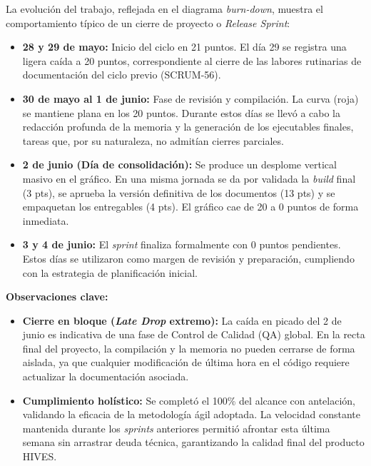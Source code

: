 La evolución del trabajo, reflejada en el diagrama \textit{burn-down}, muestra el comportamiento típico de un cierre de proyecto o \textit{Release Sprint}:

\begin{itemize}
    \item \textbf{28 y 29 de mayo:} Inicio del ciclo en 21 puntos. El día 29 se registra una ligera caída a 20 puntos, correspondiente al cierre de las labores rutinarias de documentación del ciclo previo (SCRUM-56).
    \item \textbf{30 de mayo al 1 de junio:} Fase de revisión y compilación. La curva (roja) se mantiene plana en los 20 puntos. Durante estos días se llevó a cabo la redacción profunda de la memoria y la generación de los ejecutables finales, tareas que, por su naturaleza, no admitían cierres parciales.
    \item \textbf{2 de junio (Día de consolidación):} Se produce un desplome vertical masivo en el gráfico. En una misma jornada se da por validada la \textit{build} final (3 pts), se aprueba la versión definitiva de los documentos (13 pts) y se empaquetan los entregables (4 pts). El gráfico cae de 20 a 0 puntos de forma inmediata.
    \item \textbf{3 y 4 de junio:} El \textit{sprint} finaliza formalmente con 0 puntos pendientes. Estos días se utilizaron como margen de revisión y preparación, cumpliendo con la estrategia de planificación inicial.
\end{itemize}


\noindent\textbf{Observaciones clave:}
\begin{itemize}
    \item \textbf{Cierre en bloque (\textit{Late Drop} extremo):} La caída en picado del 2 de junio es indicativa de una fase de Control de Calidad (QA) global. En la recta final del proyecto, la compilación y la memoria no pueden cerrarse de forma aislada, ya que cualquier modificación de última hora en el código requiere actualizar la documentación asociada.
    \item \textbf{Cumplimiento holístico:} Se completó el 100\% del alcance con antelación, validando la eficacia de la metodología ágil adoptada. La velocidad constante mantenida durante los \textit{sprints} anteriores permitió afrontar esta última semana sin arrastrar deuda técnica, garantizando la calidad final del producto HIVES.
\end{itemize}
\FloatBarrier
